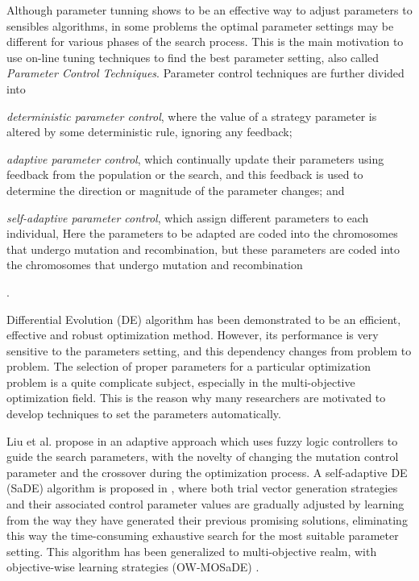 Although parameter tunning shows to be an effective way to adjust parameters to sensibles algorithms, in some problems the optimal parameter settings may be different for various phases of the search process. This is the main motivation to use on-line tuning techniques to find the best parameter setting, also called \textit{Parameter Control Techniques}. Parameter control techniques are further divided into 
\begin{inparaenum}[i)]
\item \textit{deterministic parameter control}, where the value of a strategy parameter is altered by some deterministic rule, ignoring any feedback; 
\item \textit{adaptive parameter control}, which continually update their parameters using feedback from the population or the search, and this feedback is used to determine the direction or magnitude of the parameter changes; and 
\item \textit{self-adaptive parameter control}, which assign different parameters to each individual, Here the parameters to be adapted are coded into the chromosomes that undergo mutation and recombination, but these parameters are coded into the chromosomes that undergo mutation and recombination
\end{inparaenum}\cite{Eiben1999}.

Differential Evolution (DE) algorithm has been demonstrated to be an efficient, effective and robust optimization method. However, its performance is very sensitive to the parameters setting, and this dependency changes from problem to problem. The selection of proper parameters for a particular optimization problem is a quite complicate subject, especially in the multi-objective optimization field. This is the reason why many researchers are motivated to develop techniques to set the parameters automatically.

Liu et al. propose in \cite{Liu2005} an adaptive approach which uses fuzzy logic controllers to guide the search parameters, with the novelty of changing the mutation control parameter and the crossover during the optimization process. A self-adaptive DE (SaDE) algorithm is proposed in \cite{Qin2009}, where both trial vector generation strategies and their associated control parameter values are gradually adjusted by learning from the way they have generated their previous promising solutions, eliminating this way the time-consuming exhaustive search for the most suitable parameter setting. This algorithm has been generalized to multi-objective realm, with objective-wise learning strategies (OW-MOSaDE) \cite{Huang2009}.

